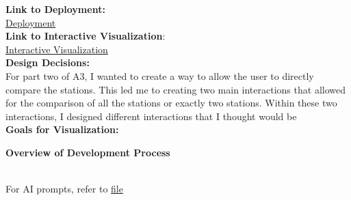 \documentclass[11pt]{article}
\begin{document}
{\Large\textbf{Link to Deployment:\\}} \href{https://chieri-jn.github.io/A3/}{Deployment}\\

{\Large\textbf{Link to Interactive Visualization}:\\}  \href{https://chieri-jn.github.io/A3/partTwo}{Interactive Visualization}\\

{\Large\textbf{Design Decisions: \\}}
For part two of A3, I wanted to create a way to allow the user to directly compare the stations. This led me to creating two main interactions that allowed for the comparison of all the stations or exactly two stations. Within these two interactions, I designed different interactions that I thought would be
\\


{\Large\textbf{Goals for Visualization:\\}}


{\Large\textbf{Overview of Development Process\\}}
\

For AI prompts, refer to \href{https://github.com/Chieri-JN/A3/blob/main/prompts.md}{file}
\label{mylastpagelabel}
\end{document}
